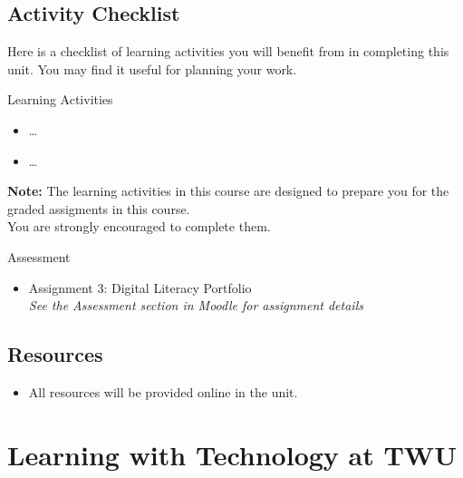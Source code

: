 \documentclass[
]{book}
\providecommand{\tightlist}{%
  \setlength{\itemsep}{0pt}\setlength{\parskip}{0pt}}
\theoremstyle{definition}
\theoremstyle{definition}
\theoremstyle{definition}
\theoremstyle{definition}
\theoremstyle{remark}
\begin{document}
\hypertarget{activity-checklist-5}{%
\subsection*{Activity Checklist}\label{activity-checklist-5}}

Here is a checklist of learning activities you will benefit from in completing this unit. You may find it useful for planning your work.

\begin{reflect}
{Learning Activities}

\begin{itemize}
\tightlist
\item
  \ldots{}
\item
  \ldots{}
\end{itemize}

\textbf{Note:} The learning activities in this course are designed to prepare you for the graded assigments in this course.\\
You are strongly encouraged to complete them.
\end{reflect}

\begin{assessment}
{Assessment}

\begin{itemize}
\tightlist
\item
  Assignment 3: Digital Literacy Portfolio\\
  \emph{See the Assessment section in Moodle for assignment details}
\end{itemize}
\end{assessment}

\hypertarget{resources-5}{%
\subsection*{Resources}\label{resources-5}}

\begin{itemize}
\tightlist
\item
  All resources will be provided online in the unit.
\end{itemize}

\hypertarget{learning-with-technology-at-twu}{%
\section{Learning with Technology at TWU}\label{learning-with-technology-at-twu}}
\end{document}
